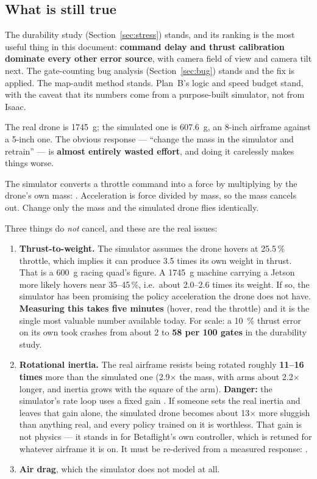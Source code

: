 \subsection*{What is still true}

The durability study (Section~\ref{sec:stress}) stands, and its ranking is the most useful thing in
this document: \textbf{command delay and thrust calibration dominate every other error source}, with
camera field of view and camera tilt next. The gate-counting bug analysis (Section~\ref{sec:bug})
stands and the fix is applied. The map-audit method stands. Plan~B's logic and speed budget stand,
with the caveat that its numbers come from a purpose-built simulator, not from Isaac.

\begin{warnbox}
The real drone is \SI{1745}{g}; the simulated one is \SI{607.6}{g}, an 8-inch airframe against a
5-inch one. The obvious response --- ``change the mass in the simulator and retrain'' --- is
\textbf{almost entirely wasted effort}, and doing it carelessly makes things worse.

The simulator converts a throttle command into a force by multiplying by the drone's own mass:
. Acceleration is force divided by
mass, so the mass cancels out. Change only the mass and the simulated drone flies identically.

Three things do \emph{not} cancel, and these are the real issues:
\begin{enumerate}
\item \textbf{Thrust-to-weight.} The simulator assumes the drone hovers at 25.5\,\% throttle, which
implies it can produce 3.5 times its own weight in thrust. That is a \SI{600}{g} racing quad's
figure. A \SI{1745}{g} machine carrying a Jetson more likely hovers near 35--45\,\%, i.e.\ about
2.0--2.6 times its weight. If so, the simulator has been promising the policy acceleration the drone
does not have. \textbf{Measuring this takes five minutes} (hover, read the throttle) and it is the
single most valuable number available today. For scale: a \SI{10}{\%} thrust error on its own took
crashes from about 2 to \textbf{58 per 100 gates} in the durability study.
\item \textbf{Rotational inertia.} The real airframe resists being rotated roughly \textbf{11--16
times} more than the simulated one (2.9$\times$ the mass, with arms about 2.2$\times$ longer, and
inertia grows with the square of the arm). \textbf{Danger:} the simulator's rate loop uses a fixed
gain . If someone sets the real inertia and leaves that gain alone, the
simulated drone becomes about 13$\times$ more sluggish than anything real, and every policy trained
on it is worthless. That gain is not physics --- it stands in for Betaflight's own controller, which
is retuned for whatever airframe it is on. It must be re-derived from a measured response:
.
\item \textbf{Air drag}, which the simulator does not model at all.
\end{enumerate}
\end{warnbox}

